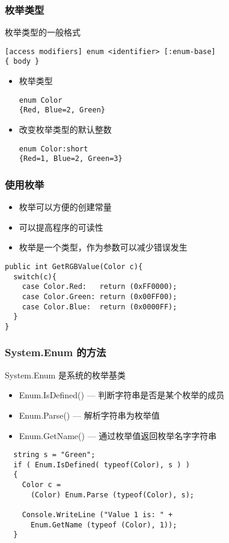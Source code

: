 
\begin{frame}[fragile]
\frametitle{枚举类型}
枚举类型的一般格式
\begin{lstlisting}
[access modifiers] enum <identifier> [:enum-base]
{ body }
\end{lstlisting}

\begin{itemize}
    \setlength{\itemsep}{8pt plus 1pt}
\item 枚举类型
\begin{lstlisting}
enum Color
{Red, Blue=2, Green}

\end{lstlisting}

\item 改变枚举类型的默认整数
\begin{lstlisting}
enum Color:short
{Red=1, Blue=2, Green=3}
\end{lstlisting}
\end{itemize}
\end{frame}

\begin{frame}[fragile]
\frametitle{使用枚举}
\begin{itemize}
\item 枚举可以方便的创建常量
\item 可以提高程序的可读性
\item 枚举是一个类型，作为参数可以减少错误发生
\end{itemize}
\begin{lstlisting}
public int GetRGBValue(Color c){
  switch(c){
    case Color.Red:   return (0xFF0000);
    case Color.Green: return (0x00FF00);
    case Color.Blue:  return (0x0000FF);
  }
}
\end{lstlisting}

\end{frame}

\begin{frame}[fragile]
\frametitle{System.Enum 的方法}
System.Enum 是系统的枚举基类
\begin{itemize}
\item Enum.IsDefined() --- 判断字符串是否是某个枚举的成员
\item Enum.Parse() --- 解析字符串为枚举值
\item Enum.GetName() --- 通过枚举值返回枚举名字字符串
\end{itemize}
\begin{lstlisting}
  string s = "Green";
  if ( Enum.IsDefined( typeof(Color), s ) )
  {
    Color c =
      (Color) Enum.Parse (typeof(Color), s);

    Console.WriteLine ("Value 1 is: " +
      Enum.GetName (typeof (Color), 1));
  }
\end{lstlisting}
\end{frame}

